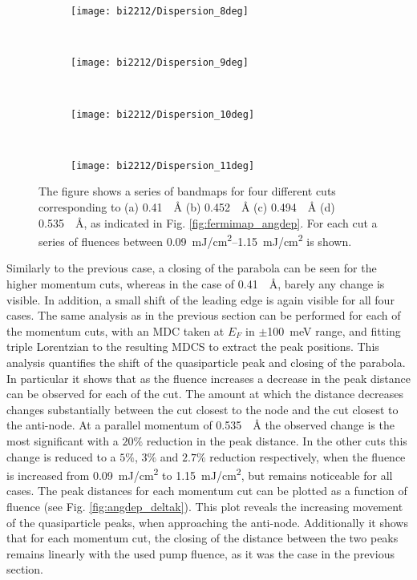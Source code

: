 \begin{figure}[t!]
	\centering
	\begin{subfigure}[b]{0.95\textwidth}
		\texttt{[image: bi2212/Dispersion\_8deg]}
		\caption{}
	\end{subfigure}
	\\
	\begin{subfigure}[b]{0.95\textwidth}
		\texttt{[image: bi2212/Dispersion\_9deg]}
		\caption{}
	\end{subfigure}
	\\
	\begin{subfigure}[b]{0.95\textwidth}
		\texttt{[image: bi2212/Dispersion\_10deg]}
		\caption{}
	\end{subfigure}
	\\
	\begin{subfigure}[b]{0.95\textwidth}
		\texttt{[image: bi2212/Dispersion\_11deg]}
		\caption{}
	\end{subfigure}
	\caption{The figure shows a series of bandmaps for four different cuts corresponding to (a) \qty{0.41}{\per\angstrom} (b) \qty{0.452}{\per\angstrom} (c) \qty{0.494}{\per\angstrom} (d) \qty{0.535}{\per\angstrom}, as indicated in Fig. \ref{fig:fermimap_angdep}. For each cut a series of fluences between \qtyrange{0.09}{1.15}{\milli\joule/\centi\meter\squared} is shown.}
	\label{fig:effect_angle}
\end{figure}

Similarly to the previous case, a closing of the parabola can be seen for the higher momentum cuts, whereas in the case of \qty{0.41}{\per\angstrom}, barely any change is visible.
In addition, a small shift of the leading edge is again visible for all four cases.
The same analysis as in the previous section can be performed for each of the momentum cuts, with an MDC taken at $E_F$ in $\pm$\qty{100}{\milli\electronvolt} range, and fitting triple Lorentzian to the resulting MDCS to extract the peak positions.
This analysis quantifies the shift of the quasiparticle peak and closing of the parabola.
In particular it shows that as the fluence increases a decrease in the peak distance can be observed for each of the cut.
The amount at which the distance decreases changes substantially between the cut closest to the node and the cut closest to the anti-node.
At a parallel momentum of \qty{0.535}{\per\angstrom} the observed change is the most significant with a $20\%$ reduction in the peak distance.
In the other cuts this change is reduced to a $5\%$, $3\%$ and $2.7\%$ reduction respectively, when the fluence is increased from \qty{0.09}{\milli\joule/\centi\meter\squared} to \qty{1.15}{\milli\joule/\centi\meter\squared}, but remains noticeable for all cases.
The peak distances for each momentum cut can be plotted as a function of fluence (see Fig. \ref{fig:angdep_deltak}).
This plot reveals the increasing movement of the quasiparticle peaks, when approaching the anti-node.
Additionally it shows that for each momentum cut, the closing of the distance between the two peaks remains linearly with the used pump fluence, as it was the case in the previous section.

